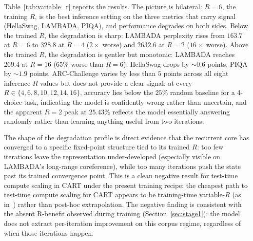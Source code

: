 \documentclass{article}
\newcommand{\cart}{\textsc{CART}}
\begin{document}
Table~\ref{tab:variable_r} reports the results. The picture is bilateral: $R{=}6$, the training $R$, is the best inference setting on the three metrics that carry signal (HellaSwag, LAMBADA, PIQA), and performance degrades on both sides. Below the trained $R$, the degradation is sharp: LAMBADA perplexity rises from $163.7$ at $R{=}6$ to $328.8$ at $R{=}4$ ($2\times$ worse) and $2632.6$ at $R{=}2$ ($16\times$ worse). Above the trained $R$, the degradation is gentler but monotonic: LAMBADA reaches $269.4$ at $R{=}16$ ($65\%$ worse than $R{=}6$); HellaSwag drops by $\sim 0.6$ points, PIQA by $\sim 1.9$ points. ARC-Challenge varies by less than $5$ points across all eight inference $R$ values but does not provide a clear signal: at every $R \in \{4, 6, 8, 10, 12, 14, 16\}$, accuracy lies below the $25\%$ random baseline for a 4-choice task, indicating the model is confidently wrong rather than uncertain, and the apparent $R{=}2$ peak at $25.43\%$ reflects the model essentially answering randomly rather than learning anything useful from two iterations.

The shape of the degradation profile is direct evidence that the recurrent core has converged to a specific fixed-point structure tied to its trained $R$: too few iterations leave the representation under-developed (especially visible on LAMBADA's long-range coreference), while too many iterations push the state past its trained convergence point. This is a clean negative result for test-time compute scaling in \cart{} under the present training recipe; the cheapest path to test-time compute scaling for \cart{} appears to be training-time variable-$R$ (as in~\citet{prairie2026parcae}) rather than post-hoc extrapolation. The negative finding is consistent with the absent R-benefit observed during training (Section~\ref{sec:stage1}): the model does not extract per-iteration improvement on this corpus regime, regardless of when those iterations happen.
\end{document}
